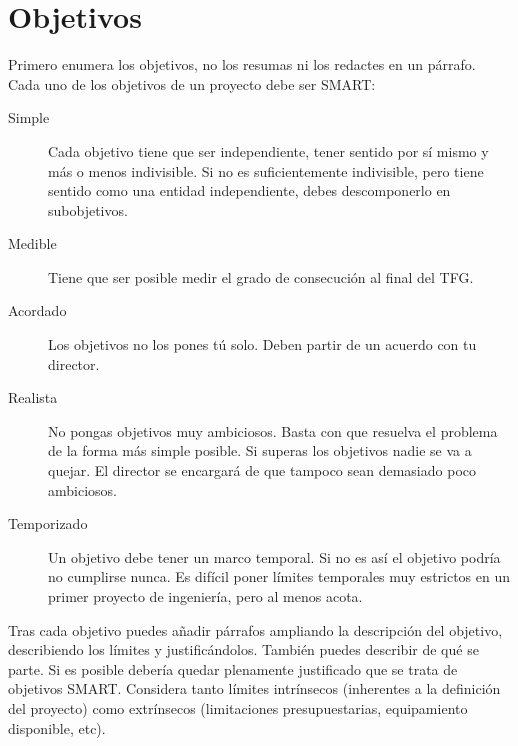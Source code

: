 \chapter{Objetivos}
\label{ch:objetivos}

Primero enumera los objetivos, no los resumas ni los redactes en un párrafo.  Cada uno de los objetivos de un proyecto debe ser SMART:

\begin{description}
\item[Simple] Cada objetivo tiene que ser independiente, tener sentido por sí mismo y más o menos indivisible.  Si no es suficientemente indivisible, pero tiene sentido como una entidad independiente, debes descomponerlo en subobjetivos.
\item[Medible] Tiene que ser posible medir el grado de consecución al final del TFG.
\item[Acordado] Los objetivos no los pones tú solo.  Deben partir de un acuerdo con tu director.
\item[Realista] No pongas objetivos muy ambiciosos. Basta con que resuelva el problema de la forma más simple posible.  Si superas los objetivos nadie se va a quejar.  El director se encargará de que tampoco sean demasiado poco ambiciosos.
\item[Temporizado] Un objetivo debe tener un marco temporal. Si no es así el objetivo podría no cumplirse nunca.  Es difícil poner límites temporales muy estrictos en un primer proyecto de ingeniería, pero al menos acota.
\end{description}

Tras cada objetivo puedes añadir párrafos ampliando la descripción del objetivo, describiendo los límites y justificándolos.  También puedes describir de qué se parte.  Si es posible debería quedar plenamente justificado que se trata de objetivos SMART.  Considera tanto límites intrínsecos (inherentes a la definición del proyecto) como extrínsecos (limitaciones presupuestarias, equipamiento disponible, etc).